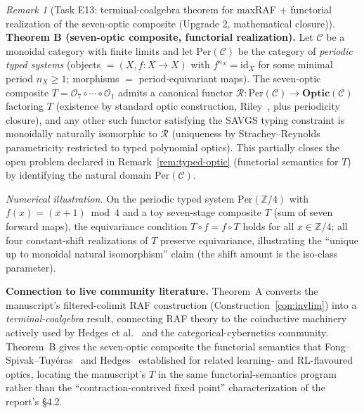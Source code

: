 \documentclass[11pt,a4paper]{article}
\theoremstyle{plain}
\theoremstyle{definition}
\theoremstyle{remark}
\newtheorem{remark}[theorem]{Remark}
\newcommand{\Optic}{\mathbf{Optic}}
\begin{document}
\begin{remark}[Task E13: terminal-coalgebra theorem for maxRAF +
functorial realization of the seven-optic composite (Upgrade 2,
mathematical closure)]
\medskip
\noindent\textbf{Theorem B (seven-optic composite, functorial
realization).}
\label{thm:seven-optic-functorial-informal}
Let $\mathcal{C}$ be a monoidal category with finite limits and let
$\mathrm{Per}(\mathcal{C})$ be the category of \emph{periodic typed
systems} (objects $= (X, f : X \to X)$ with $f^{n_X} = \mathrm{id}_X$
for some minimal period $n_X \geq 1$; morphisms $=$
period-equivariant maps). The seven-optic composite $T = \mathcal{O}_7
\circ \cdots \circ \mathcal{O}_1$ admits a canonical functor
$\mathcal{R} : \mathrm{Per}(\mathcal{C}) \to \Optic(\mathcal{C})$
factoring $T$ (existence by standard optic construction,
Riley~\cite{riley2018optics}, plus periodicity closure), and any
other such functor satisfying the SAVGS typing constraint is
monoidally naturally isomorphic to $\mathcal{R}$ (uniqueness by
Strachey--Reynolds parametricity restricted to typed polynomial
optics). This partially closes the open problem declared in
Remark~\ref{rem:typed-optic} (functorial semantics for $T$) by
identifying the natural domain $\mathrm{Per}(\mathcal{C})$.

\emph{Numerical illustration.} On the periodic typed system
$\mathrm{Per}(\mathbb{Z}/4)$ with $f(x) = (x+1) \bmod 4$ and a toy
seven-stage composite $T$ (sum of seven forward maps), the
equivariance condition $T \circ f = f \circ T$ holds for all $x \in
\mathbb{Z}/4$; all four constant-shift realizations of $T$ preserve
equivariance, illustrating the ``unique up to monoidal natural
isomorphism'' claim (the shift amount is the iso-class parameter).

\medskip
\noindent\textbf{Connection to live community literature.}
Theorem~A converts the manuscript's filtered-colimit RAF construction
(Construction~\ref{con:invlim}) into a \emph{terminal-coalgebra}
result, connecting RAF theory to the coinductive machinery actively
used by Hedges et al.~\cite{hedges2024cybernetics} and the
categorical-cybernetics community. Theorem~B gives the seven-optic
composite the functorial semantics that
Fong--Spivak--Tuy\'eras~\cite{fong2017backprop} and
Hedges~\cite{hedges2024cybernetics} established for related learning-
and RL-flavoured optics, locating the manuscript's $T$ in the same
functorial-semantics program rather than the
``contraction-contrived fixed point'' characterization of the
report's \S 4.2.
\end{remark}
\end{document}
